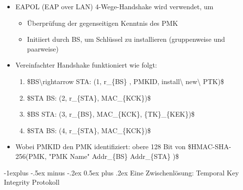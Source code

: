 \documentclass[a4paper]{article}
\makeatletter
\renewcommand{\subsection}{\@startsection{subsection}{2}{0mm}%
 {-1explus -.5ex minus -.2ex}%
 {0.5ex plus .2ex}%
 {\normalfont\normalsize\bfseries}}
\makeatother
\begin{document}
\begin{multicols}{3}
\begin{itemize}
              \begin{itemize}
                  \item
                        EAPOL (EAP over LAN) 4-Wege-Handshake wird verwendet, um

                        \begin{itemize}
                            \item
                                  Überprüfung der gegenseitigen Kenntnis des PMK
                            \item
                                  Initiiert durch BS, um Schlüssel zu installieren (gruppenweise und
                                  paarweise)
                        \end{itemize}
                  \item
                        Vereinfachter Handshake funktioniert wie folgt:

                        \begin{enumerate}
                            \def\labelenumi{\arabic{enumi}.}
                            \item
                                  \$BS\textbackslash rightarrow STA: (1, r\_\{BS\} , PMKID,
                                  install\textbackslash{} new\textbackslash{} PTK)\$
                            \item
                                  \$STA BS: (2, r\_\{STA\}, MAC\_\{KCK\})\$
                            \item
                                  \$BS STA: (3, r\_\{BS\}, MAC\_\{KCK\}, \{TK\}\_\{KEK\})\$
                            \item
                                  \$STA BS: (4, r\_\{STA\}, MAC\_\{KCK\})\$
                        \end{enumerate}
                  \item
                        Wobei PMKID den PMK identifiziert: obere 128 Bit von
                        \$HMAC-SHA-256(PMK, "PMK Name" \textbar\textbar{} Addr\_\{BS\}
                        \textbar\textbar{} Addr\_\{STA\} )\$
              \end{itemize}
    \end{itemize}


    \subsection{Eine Zwischenlösung: Temporal Key Integrity
        Protokoll}


\end{multicols}
\end{document}

